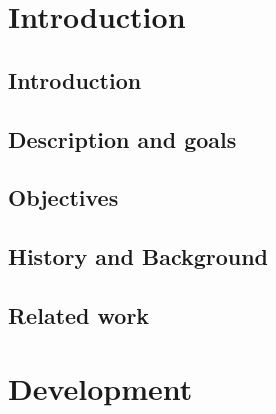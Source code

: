\documentclass[BSP,english,oneside]{classes/gucthesis}
\begin{document}


\makefrontpages



\clearpage
\setcounter{page}{1}





\tableofcontents
\listoffigures
\listoftables



\newpage
\setcounter{page}{1}
\part{Introduction}
	
	\chapter{Introduction}
		\setcounter{page}{2}	%
		\label{chap:introduction}
		

	\chapter{Description and goals}
		\label{chap:description_goals}
		

	\chapter{Objectives}
		\label{chap:objectives}
		

	\chapter{History and Background}
		\label{chap:background}
		

	\chapter{Related work}
		\label{chap:related_work}
		


\part{Development}
\end{document}
